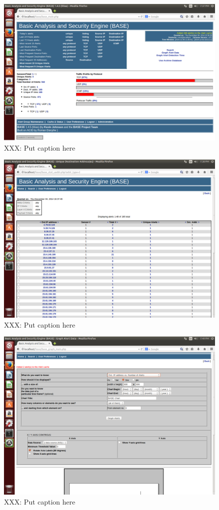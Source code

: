 \begin{figure}[!t]
    \centering
    \includegraphics[width=\columnwidth]{figures/R2_BASE_Main}
    \caption{XXX: Put caption here}
    \label{fig:r2}
\end{figure}

\begin{figure}[!t]
    \centering
    \includegraphics[width=\columnwidth]{figures/R3_BASE_IPList}
    \caption{XXX: Put caption here}
    \label{fig:r3}
\end{figure}

\begin{figure}[!t]
    \centering
    \includegraphics[width=\columnwidth]{figures/R4_BASE_Report}
    \caption{XXX: Put caption here}
    \label{fig:r4}
\end{figure}





